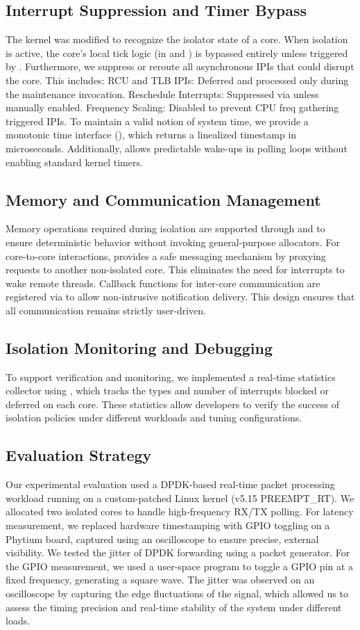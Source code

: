 \documentclass[letterpaper]{article}
\begin{document}
\subsection{Interrupt Suppression and Timer Bypass} 
The kernel was modified to recognize the isolator state of a core. When isolation is active, the
core's local tick logic (in and ) is bypassed entirely unless triggered by . Furthermore, we suppress
or reroute all asynchronous IPIs that could disrupt the core. This includes:
RCU and TLB IPIs: Deferred and processed only during the maintenance invocation.
Reschedule Interrupts: Suppressed via unless manually enabled.
Frequency Scaling: Disabled to prevent CPU freq gathering triggered IPIs.
To maintain a valid notion of system time, we provide a monotonic time interface (), which returns
a linealized timestamp in microseconds. Additionally, allows predictable wake-ups in polling loops
without enabling standard kernel timers.

\subsection{Memory and Communication Management}
Memory operations required during isolation are supported through and to ensure deterministic
behavior without invoking general-purpose allocators. For core-to-core interactions, provides a
safe messaging mechanism by proxying requests to another non-isolated core. This eliminates the
need for interrupts to wake remote threads.
Callback functions for inter-core communication are registered via to allow non-intrusive
notification delivery. This design ensures that all communication remains strictly user-driven.

\subsection{Isolation Monitoring and Debugging}
To support verification and monitoring, we implemented a real-time statistics collector using ,
which tracks the types and number of interrupts blocked or deferred on each core. These statistics
allow developers to verify the success of isolation policies under different workloads and tuning
configurations.

\subsection{Evaluation Strategy}
Our experimental evaluation used a DPDK-based real-time packet processing workload running on
a custom-patched Linux kernel (v5.15 PREEMPT\_RT). We allocated two isolated cores to handle
high-frequency RX/TX polling. For latency measurement, we replaced hardware timestamping
with GPIO toggling on a Phytium board, captured using an oscilloscope to ensure precise,
external visibility.
We tested the jitter of DPDK forwarding using a packet generator.
For the GPIO measurement, we used a user-space program to toggle a GPIO pin at a fixed
frequency, generating a square wave. The jitter was observed on an oscilloscope by capturing the
edge fluctuations of the signal, which allowed us to assess the timing precision and real-time
stability of the system under different loads.
\end{document}
